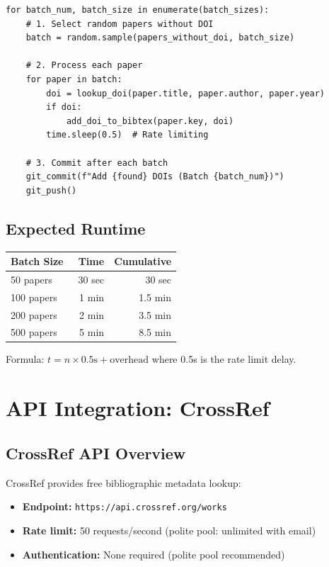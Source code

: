 \begin{verbatim}
for batch_num, batch_size in enumerate(batch_sizes):
    # 1. Select random papers without DOI
    batch = random.sample(papers_without_doi, batch_size)

    # 2. Process each paper
    for paper in batch:
        doi = lookup_doi(paper.title, paper.author, paper.year)
        if doi:
            add_doi_to_bibtex(paper.key, doi)
        time.sleep(0.5)  # Rate limiting

    # 3. Commit after each batch
    git_commit(f"Add {found} DOIs (Batch {batch_num})")
    git_push()
\end{verbatim}

\subsection{Expected Runtime}

\begin{center}
\begin{tabular}{lrr}
\toprule
\textbf{Batch Size} & \textbf{Time} & \textbf{Cumulative} \\
\midrule
50 papers & ~30 sec & 30 sec \\
100 papers & ~1 min & 1.5 min \\
200 papers & ~2 min & 3.5 min \\
500 papers & ~5 min & 8.5 min \\
\bottomrule
\end{tabular}
\end{center}

Formula: $t = n \times 0.5\text{s} + \text{overhead}$ where 0.5s is the rate limit delay.

\section{API Integration: CrossRef}
\label{sec:api-crossref}

\subsection{CrossRef API Overview}

CrossRef provides free bibliographic metadata lookup:

\begin{itemize}
    \item \textbf{Endpoint:} \texttt{https://api.crossref.org/works}
    \item \textbf{Rate limit:} 50 requests/second (polite pool: unlimited with email)
    \item \textbf{Authentication:} None required (polite pool recommended)
\end{itemize}

